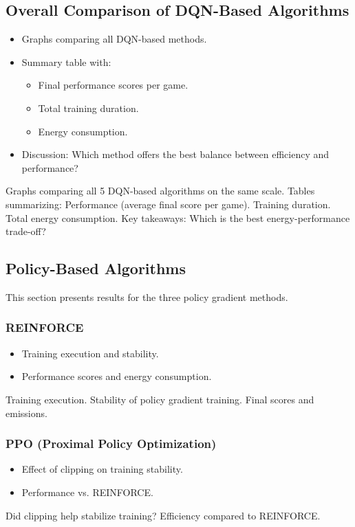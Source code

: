 \subsection{Overall Comparison of DQN-Based Algorithms}
\begin{itemize}
	\item Graphs comparing all DQN-based methods.
	\item Summary table with:
	\begin{itemize}
		\item Final performance scores per game.
		\item Total training duration.
		\item Energy consumption.
	\end{itemize}
	\item Discussion: Which method offers the best balance between efficiency and performance?
\end{itemize}
Graphs comparing all 5 DQN-based algorithms on the same scale.
Tables summarizing:
Performance (average final score per game).
Training duration.
Total energy consumption.
Key takeaways: Which is the best energy-performance trade-off?

\subsection{Policy-Based Algorithms}
This section presents results for the three policy gradient methods.

\subsubsection{REINFORCE}
\begin{itemize}
	\item Training execution and stability.
	\item Performance scores and energy consumption.
\end{itemize}
Training execution.
Stability of policy gradient training.
Final scores and emissions.


\subsubsection{PPO (Proximal Policy Optimization)}
\begin{itemize}
	\item Effect of clipping on training stability.
	\item Performance vs. REINFORCE.
\end{itemize}
Did clipping help stabilize training?
Efficiency compared to REINFORCE.


